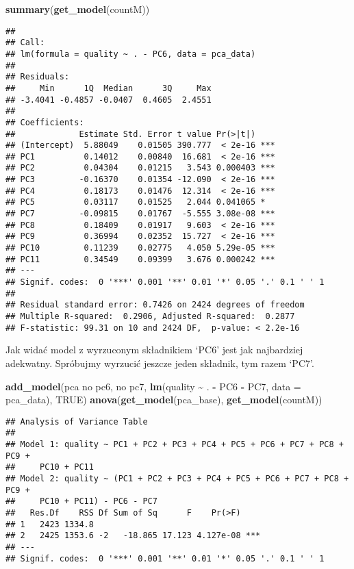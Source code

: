 \documentclass[
]{article}
\newenvironment{Shaded}{\begin{snugshade}}{\end{snugshade}}
\newcommand{\AttributeTok}[1]{\textcolor[rgb]{0.13,0.29,0.53}{#1}}
\newcommand{\ConstantTok}[1]{\textcolor[rgb]{0.56,0.35,0.01}{#1}}
\newcommand{\FunctionTok}[1]{\textcolor[rgb]{0.13,0.29,0.53}{\textbf{#1}}}
\newcommand{\NormalTok}[1]{#1}
\newcommand{\SpecialCharTok}[1]{\textcolor[rgb]{0.81,0.36,0.00}{\textbf{#1}}}
\newcommand{\StringTok}[1]{\textcolor[rgb]{0.31,0.60,0.02}{#1}}
\begin{document}
\begin{Shaded}
\begin{Highlighting}[]
\FunctionTok{summary}\NormalTok{(}\FunctionTok{get\_model}\NormalTok{(countM))}
\end{Highlighting}
\end{Shaded}

\begin{verbatim}
## 
## Call:
## lm(formula = quality ~ . - PC6, data = pca_data)
## 
## Residuals:
##     Min      1Q  Median      3Q     Max 
## -3.4041 -0.4857 -0.0407  0.4605  2.4551 
## 
## Coefficients:
##             Estimate Std. Error t value Pr(>|t|)    
## (Intercept)  5.88049    0.01505 390.777  < 2e-16 ***
## PC1          0.14012    0.00840  16.681  < 2e-16 ***
## PC2          0.04304    0.01215   3.543 0.000403 ***
## PC3         -0.16370    0.01354 -12.090  < 2e-16 ***
## PC4          0.18173    0.01476  12.314  < 2e-16 ***
## PC5          0.03117    0.01525   2.044 0.041065 *  
## PC7         -0.09815    0.01767  -5.555 3.08e-08 ***
## PC8          0.18409    0.01917   9.603  < 2e-16 ***
## PC9          0.36994    0.02352  15.727  < 2e-16 ***
## PC10         0.11239    0.02775   4.050 5.29e-05 ***
## PC11         0.34549    0.09399   3.676 0.000242 ***
## ---
## Signif. codes:  0 '***' 0.001 '**' 0.01 '*' 0.05 '.' 0.1 ' ' 1
## 
## Residual standard error: 0.7426 on 2424 degrees of freedom
## Multiple R-squared:  0.2906, Adjusted R-squared:  0.2877 
## F-statistic: 99.31 on 10 and 2424 DF,  p-value: < 2.2e-16
\end{verbatim}

Jak widać model z wyrzuconym składnikiem `PC6' jest jak najbardziej
adekwatny. Spróbujmy wyrzucić jeszcze jeden składnik, tym razem `PC7'.

\begin{Shaded}
\begin{Highlighting}[]
\FunctionTok{add\_model}\NormalTok{(}\StringTok{\textquotesingle{}pca no pc6, no pc7\textquotesingle{}}\NormalTok{, }\FunctionTok{lm}\NormalTok{(quality }\SpecialCharTok{\textasciitilde{}}\NormalTok{ . }\SpecialCharTok{{-}}\NormalTok{ PC6 }\SpecialCharTok{{-}}\NormalTok{ PC7, }\AttributeTok{data =}\NormalTok{ pca\_data), }\ConstantTok{TRUE}\NormalTok{)}
\FunctionTok{anova}\NormalTok{(}\FunctionTok{get\_model}\NormalTok{(pca\_base), }\FunctionTok{get\_model}\NormalTok{(countM))}
\end{Highlighting}
\end{Shaded}

\begin{verbatim}
## Analysis of Variance Table
## 
## Model 1: quality ~ PC1 + PC2 + PC3 + PC4 + PC5 + PC6 + PC7 + PC8 + PC9 + 
##     PC10 + PC11
## Model 2: quality ~ (PC1 + PC2 + PC3 + PC4 + PC5 + PC6 + PC7 + PC8 + PC9 + 
##     PC10 + PC11) - PC6 - PC7
##   Res.Df    RSS Df Sum of Sq      F    Pr(>F)    
## 1   2423 1334.8                                  
## 2   2425 1353.6 -2   -18.865 17.123 4.127e-08 ***
## ---
## Signif. codes:  0 '***' 0.001 '**' 0.01 '*' 0.05 '.' 0.1 ' ' 1
\end{verbatim}
\end{document}
